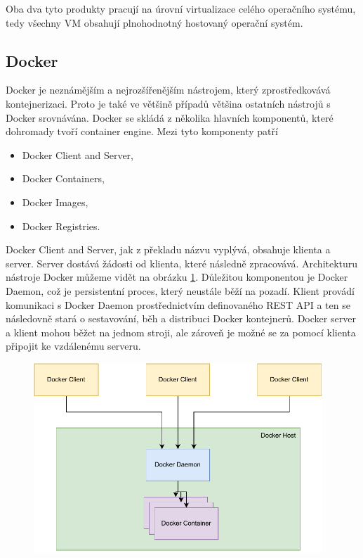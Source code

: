 Oba dva tyto produkty pracují na úrovní virtualizace celého operačního systému, tedy všechny VM obsahují plnohodnotný hostovaný operační systém.

\subsection{Docker}
Docker je neznámějším a nejrozšířenějším nástrojem, který zprostředkovává kontejnerizaci. Proto je také ve většině případů většina ostatních nástrojů s Docker srovnávána. Docker se skládá z několika hlavních komponentů, které dohromady tvoří container engine. Mezi tyto komponenty patří

\begin{itemize}
    \item Docker Client and Server,
    \item Docker Containers,
    \item Docker Images,
    \item Docker Registries.
\end{itemize}

Docker Client and Server, jak z překladu názvu vyplývá, obsahuje klienta a server. Server dostává žádosti od klienta, které následně zpracovává. Architekturu nástroje Docker můžeme vidět na obrázku \ref{fig:docker_arch}. Důležitou komponentou je Docker Daemon, což je persistentní proces, který neustále běží na pozadí. Klient provádí komunikaci s Docker Daemon prostřednictvím definovaného REST API a ten se následovně stará o sestavování, běh a distribuci Docker kontejnerů. Docker server a klient mohou běžet na jednom stroji, ale zároveň je možné se za pomocí klienta připojit ke vzdálenému serveru.\,\cite{turnbull2014docker}\cite{docker_overview}

\begin{figure}[htbp]
    \centering 
    \includegraphics[width=0.97\textwidth]{assets/img/docker_arch.pdf}
    \label{fig:docker_arch}
\end{figure}

